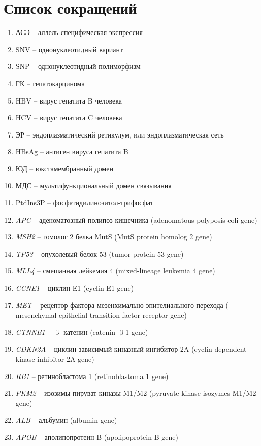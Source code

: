 \section{Список сокращений}

\begin{enumerate}
	\footnotesize
	\item АСЭ -- аллель-специфическая экспрессия
	\item SNV -- однонуклеотидный вариант
	\item SNP -- однонуклеотидный полиморфизм
	\item ГК -- гепатокарцинома
	\item HBV -- вирус гепатита B человека
	\item HCV -- вирус гепатита C человека
	\item ЭР -- эндоплазматический ретикулум, или эндоплазматическая сеть
	\item HBsAg -- антиген вируса гепатита B
	\item ЮД -- юкстамембранный домен 
	\item МДС -- мультифункциональный домен связывания
	\item PtdIns3P -- фосфатидилинозитол-трифосфат
	\item \textit{APC} -- аденоматозный полипоз кишечника (adenomatous polyposis coli gene)
	\item \textit{MSH2} -- гомолог 2 белка MutS (MutS protein homolog 2 gene)
	\item \textit{TP53} -- опухолевый белок 53 (tumor protein 53 gene)
	\item \textit{MLL4} -- смешанная лейкемия 4 (mixed-lineage leukemia 4 gene)
	\item \textit{CCNE1} -- циклин E1 (cyclin E1 gene)
	\item \textit{MET} -- рецептор фактора мезенхимально-эпителиального перехода ( mesenchymal-epithelial transition factor receptor gene) 
	\item \textit{CTNNB1} -- $\upbeta$-катенин (catenin $\upbeta$1 gene)
	\item \textit{CDKN2A} -- циклин-зависимый киназный ингибитор 2A (cyclin-dependent kinase inhibitor 2A gene)
	\item \textit{RB1} -- ретинобластома 1 (retinoblastoma 1 gene)
	\item \textit{PKM2} -- изозимы пируват киназы M1/M2 (pyruvate kinase isozymes M1/M2 gene)
	\item \textit{ALB} -- альбумин (albumin gene)
	\item \textit{APOB} -- аполипопротеин B (apolipoprotein B gene)

\end{enumerate}
